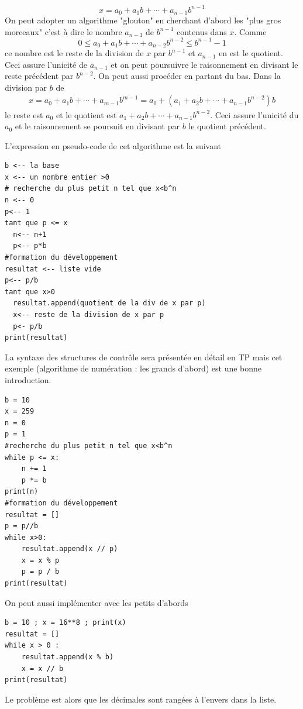 \begin{demo}
\begin{displaymath}
 x=a_0 + a_1 b +\cdots +a_{n-1}b^{n-1}
\end{displaymath}
On peut adopter un algorithme "glouton" en cherchant d'abord les "plus gros morceaux" c'est à dire le nombre $a_{n-1}$ de $b^{n-1}$ contenus dans $x$. Comme 
\begin{displaymath}
 0\leq a_0 + a_1 b +\cdots +a_{n-2}b^{n-2}\leq b^{n-1}-1
\end{displaymath}
ce nombre est le reste de la division de $x$ par $b^{n-1}$ et $a_{n-1}$ en est le quotient. Ceci assure l'unicité de $a_{n-1}$ et on peut poursuivre le raisonnement en divisant le reste précédent par $b^{n-2}$.\newline
On peut aussi procéder en partant du bas. Dans la division par $b$ de
\begin{align*}
 x= a_0 + a_1 b +\cdots +a_{m-1}b^{m-1} = a_0 +(a_1+a_2b+\cdots+a_{n-1}b^{n-2})b
\end{align*}
le reste est $a_0$ et le quotient est $a_1+a_2b+\cdots+a_{n-1}b^{n-2}$. Ceci assure l'unicité du $a_0$ et le raisonnement se poursuit en divisant par $b$ le quotient précédent.
\end{demo}
L'expression en pseudo-code de cet algorithme est la suivant
\begin{verbatim}
b <-- la base
x <-- un nombre entier >0
# recherche du plus petit n tel que x<b^n
n <-- 0
p<-- 1
tant que p <= x
  n<-- n+1
  p<-- p*b
#formation du développement
resultat <-- liste vide
p<-- p/b
tant que x>0
  resultat.append(quotient de la div de x par p)
  x<-- reste de la division de x par p
  p<- p/b
print(resultat)
\end{verbatim}
La syntaxe des structures de contrôle sera présentée en détail en TP mais cet exemple (algorithme de numération : les grands d'abord) est une bonne introduction.
\begin{verbatim}
b = 10
x = 259
n = 0
p = 1
#recherche du plus petit n tel que x<b^n
while p <= x:
    n += 1
    p *= b
print(n)
#formation du développement
resultat = []
p = p//b
while x>0:
    resultat.append(x // p)
    x = x % p
    p = p / b
print(resultat) 
\end{verbatim}
On peut aussi implémenter avec les petits d'abords
  \begin{verbatim}
b = 10 ; x = 16**8 ; print(x)
resultat = []
while x > 0 :
    resultat.append(x % b)
    x = x // b
print(resultat)  
\end{verbatim}
Le problème est alors que les décimales sont rangées à l'envers dans la liste. 

